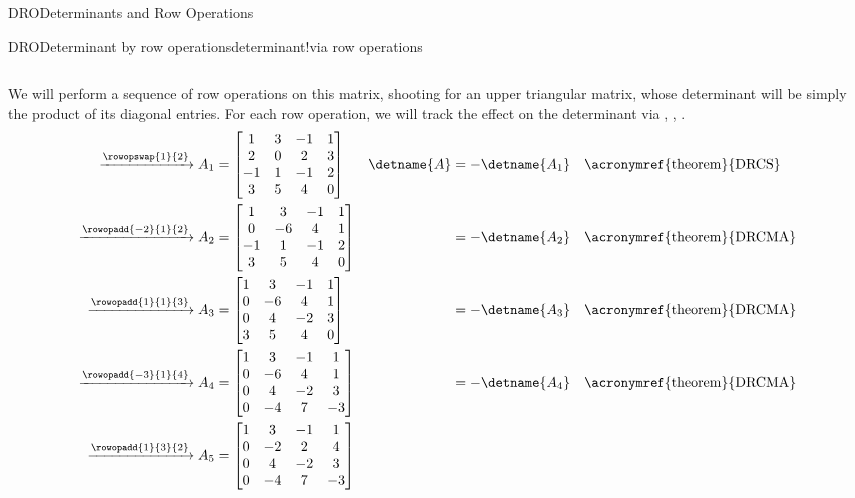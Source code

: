 \begin{subsect}{DRO}{Determinants and Row Operations}
\begin{example}{DRO}{Determinant by row operations}{determinant!via row operations}
\begin{para}
\begin{equation*}
\end{equation*}
\end{para}
%
\begin{para}We will perform a sequence of row operations on this matrix, shooting for an upper triangular matrix, whose determinant will be simply the product of its diagonal entries.  For each row operation, we will track the effect on the determinant via , , .
%
\begin{align*}
\xrightarrow{\rowopswap{1}{2}}
A_1&=
\begin{bmatrix}
1 & 3 &-1 & 1 \\
2 & 0 & 2 & 3 \\
-1& 1 &-1 & 2 \\
3 & 5 & 4 & 0
\end{bmatrix}
&
\detname{A}&=-\detname{A_1}&&\text{\acronymref{theorem}{DRCS}}\\
%
\xrightarrow{\rowopadd{-2}{1}{2}}
A_2&=
\begin{bmatrix}
1 & 3 &-1 & 1 \\
0 &-6 & 4 & 1 \\
-1& 1 &-1 & 2 \\
3 & 5 & 4 & 0
\end{bmatrix}
&
&=-\detname{A_2}&&\text{\acronymref{theorem}{DRCMA}}\\
%
\xrightarrow{\rowopadd{1}{1}{3}}
A_3&=
\begin{bmatrix}
1 & 3 &-1 & 1 \\
0 &-6 & 4 & 1 \\
0 & 4 &-2 & 3 \\
3 & 5 & 4 & 0
\end{bmatrix}
&
&=-\detname{A_3}&&\text{\acronymref{theorem}{DRCMA}}\\
%
\xrightarrow{\rowopadd{-3}{1}{4}}
A_4&=
\begin{bmatrix}
1 & 3 &-1 & 1 \\
0 &-6 & 4 & 1 \\
0 & 4 &-2 & 3 \\
0 &-4 & 7 &-3
\end{bmatrix}
&
&=-\detname{A_4}&&\text{\acronymref{theorem}{DRCMA}}\\
%
\xrightarrow{\rowopadd{1}{3}{2}}
A_5&=
\begin{bmatrix}
1 & 3 &-1 & 1 \\
0 &-2 & 2 & 4 \\
0 & 4 &-2 & 3 \\
0 &-4 & 7 &-3
\end{bmatrix}

\end{align*}
\end{para}
\end{example}
\end{subsect}
